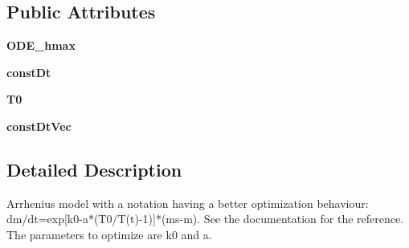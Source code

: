 \subsection*{\-Public \-Attributes}
\begin{DoxyCompactItemize}
\item 
\hypertarget{classModels_1_1ArrheniusModelAlternativeNotation1_ab8132192339934ceea7d1648bd34b32b}{{\bfseries \-O\-D\-E\-\_\-hmax}}\label{classModels_1_1ArrheniusModelAlternativeNotation1_ab8132192339934ceea7d1648bd34b32b}

\item 
\hypertarget{classModels_1_1ArrheniusModelAlternativeNotation1_abe5a4fb1d1b0647b9f0b2d6e0d97847a}{{\bfseries const\-Dt}}\label{classModels_1_1ArrheniusModelAlternativeNotation1_abe5a4fb1d1b0647b9f0b2d6e0d97847a}

\item 
\hypertarget{classModels_1_1ArrheniusModelAlternativeNotation1_a2bd7e9b3e4a167201e2634b5c7865255}{{\bfseries \-T0}}\label{classModels_1_1ArrheniusModelAlternativeNotation1_a2bd7e9b3e4a167201e2634b5c7865255}

\item 
\hypertarget{classModels_1_1Model_a3f71983de5f8b86bec47929213b900ec}{{\bfseries const\-Dt\-Vec}}\label{classModels_1_1Model_a3f71983de5f8b86bec47929213b900ec}

\end{DoxyCompactItemize}


\subsection{\-Detailed \-Description}
\begin{DoxyVerb}Arrhenius model with a notation having a better optimization behaviour: dm/dt=exp[k0-a*(T0/T(t)-1)]*(ms-m). See the documentation for the reference. The parameters to optimize are k0 and a.\end{DoxyVerb}
 

